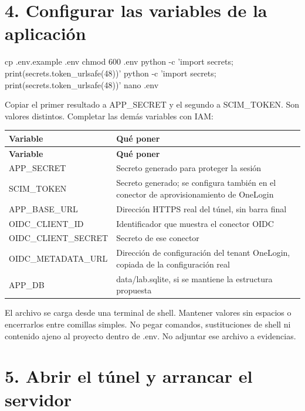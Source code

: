 \documentclass[12pt,a4paper]{article}
\begin{document}
\section*{4. Configurar las variables de la aplicación}
\begin{Comandos}
cp .env.example .env
chmod 600 .env
python -c 'import secrets; print(secrets.token_urlsafe(48))'
python -c 'import secrets; print(secrets.token_urlsafe(48))'
nano .env
\end{Comandos}
Copiar el primer resultado a \textnormal{APP\_\allowbreak{}SECRET} y el segundo a \textnormal{SCIM\_\allowbreak{}TOKEN}. Son valores distintos. Completar las demás variables con IAM:\par
{\small\renewcommand{\arraystretch}{1.2}
\begin{longtable}{p{7.760cm}p{7.760cm}}
\toprule
\textbf{Variable} & \textbf{Qué poner} \\ \midrule\endfirsthead
\textbf{Variable} & \textbf{Qué poner} \\ \midrule\endhead
\textnormal{APP\_\allowbreak{}SECRET} & Secreto generado para proteger la sesión \\
\textnormal{SCIM\_\allowbreak{}TOKEN} & Secreto generado; se configura también en el conector de aprovisionamiento de OneLogin \\
\textnormal{APP\_\allowbreak{}BASE\_\allowbreak{}URL} & Dirección HTTPS real del túnel, sin barra final \\
\textnormal{OIDC\_\allowbreak{}CLIENT\_\allowbreak{}ID} & Identificador que muestra el conector OIDC \\
\textnormal{OIDC\_\allowbreak{}CLIENT\_\allowbreak{}SECRET} & Secreto de ese conector \\
\textnormal{OIDC\_\allowbreak{}METADATA\_\allowbreak{}URL} & Dirección de configuración del tenant OneLogin, copiada de la configuración real \\
\textnormal{APP\_\allowbreak{}DB} & \textnormal{data/\allowbreak{}lab.sqlite}, si se mantiene la estructura propuesta \\
\bottomrule\end{longtable}}
El archivo se carga desde una terminal de shell. Mantener valores sin espacios o encerrarlos entre comillas simples. No pegar comandos, sustituciones de shell ni contenido ajeno al proyecto dentro de \textnormal{.env}. No adjuntar ese archivo a evidencias.\par
{}\section*{5. Abrir el túnel y arrancar el servidor}
\end{document}
